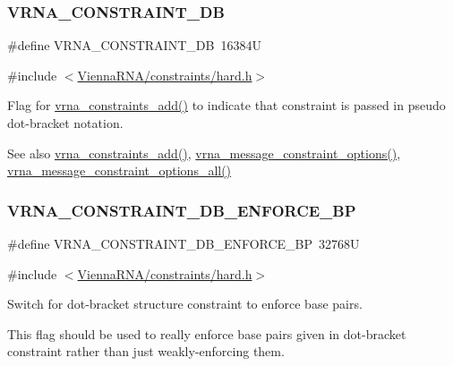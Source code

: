 \subsubsection{\texorpdfstring{VRNA\_CONSTRAINT\_DB}{VRNA\_CONSTRAINT\_DB}}
{\footnotesize\ttfamily \#define V\+R\+N\+A\+\_\+\+C\+O\+N\+S\+T\+R\+A\+I\+N\+T\+\_\+\+DB~16384U}



{\ttfamily \#include $<$\mbox{\hyperlink{hard_8h}{Vienna\+R\+N\+A/constraints/hard.\+h}}$>$}



Flag for \mbox{\hyperlink{group__constraints_ga35a401f680969a556858a8dd5f1d07cc}{vrna\+\_\+constraints\+\_\+add()}} to indicate that constraint is passed in pseudo dot-\/bracket notation. 

\begin{DoxySeeAlso}{See also}
\mbox{\hyperlink{group__constraints_ga35a401f680969a556858a8dd5f1d07cc}{vrna\+\_\+constraints\+\_\+add()}}, \mbox{\hyperlink{group__constraints_gaa1f20b53bf09ac2e6b0dbb13f7d89670}{vrna\+\_\+message\+\_\+constraint\+\_\+options()}}, \mbox{\hyperlink{group__constraints_gaec7e13fa0465c2acc7a621d1aecb709f}{vrna\+\_\+message\+\_\+constraint\+\_\+options\+\_\+all()}} 
\end{DoxySeeAlso}
\mbox{\label{group__hard__constraints_ga29ebe940110d60ab798fdacbcdbbfb7d}} 
\subsubsection{\texorpdfstring{VRNA\_CONSTRAINT\_DB\_ENFORCE\_BP}{VRNA\_CONSTRAINT\_DB\_ENFORCE\_BP}}
{\footnotesize\ttfamily \#define V\+R\+N\+A\+\_\+\+C\+O\+N\+S\+T\+R\+A\+I\+N\+T\+\_\+\+D\+B\+\_\+\+E\+N\+F\+O\+R\+C\+E\+\_\+\+BP~32768U}



{\ttfamily \#include $<$\mbox{\hyperlink{hard_8h}{Vienna\+R\+N\+A/constraints/hard.\+h}}$>$}



Switch for dot-\/bracket structure constraint to enforce base pairs. 

This flag should be used to really enforce base pairs given in dot-\/bracket constraint rather than just weakly-\/enforcing them.

